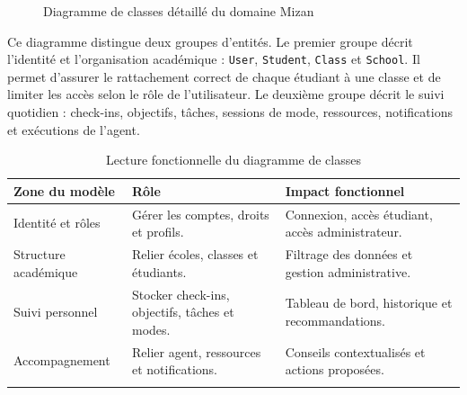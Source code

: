 \documentclass{rapportENSET}
\begin{document}
\begin{figure}[H]
{{{{
}
}
}
}
\caption{Diagramme de classes détaillé du domaine Mizan}
\end{figure}

Ce diagramme distingue deux groupes d'entités. Le premier groupe décrit l'identité et l'organisation académique : \texttt{User}, \texttt{Student}, \texttt{Class} et \texttt{School}. Il permet d'assurer le rattachement correct de chaque étudiant à une classe et de limiter les accès selon le rôle de l'utilisateur. Le deuxième groupe décrit le suivi quotidien : check-ins, objectifs, tâches, sessions de mode, ressources, notifications et exécutions de l'agent.

\begin{longtable}{@{}L{0.25\textwidth}L{0.36\textwidth}L{0.29\textwidth}@{}}
\toprule
\textbf{Zone du modèle} & \textbf{Rôle} & \textbf{Impact fonctionnel} \\
\midrule
\endhead
Identité et rôles & Gérer les comptes, droits et profils. & Connexion, accès étudiant, accès administrateur. \\
Structure académique & Relier écoles, classes et étudiants. & Filtrage des données et gestion administrative. \\
Suivi personnel & Stocker check-ins, objectifs, tâches et modes. & Tableau de bord, historique et recommandations. \\
Accompagnement & Relier agent, ressources et notifications. & Conseils contextualisés et actions proposées. \\
\bottomrule
\caption{Lecture fonctionnelle du diagramme de classes}
\end{longtable}
\end{document}
